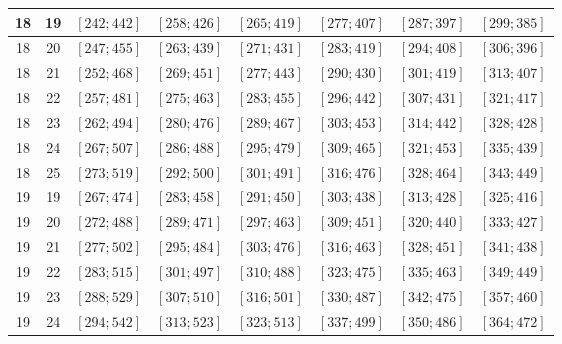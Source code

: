 \documentclass[a4paper,12pt]{article}
\begin{document}
\begin{center}
{\begin{longtable}[H]{|c|c|c|c|c|c|c|c|}
18 &  19 &  $\left[ 242; 442\right]$ &  $\left[ 258; 426\right]$ &  $\left[ 265; 419\right]$ &  $\left[ 277; 407\right]$ &  $\left[ 287; 397\right]$ &  $\left[ 299; 385\right]$ \tabularnewline \hline
18 &  20 &  $\left[ 247; 455\right]$ &  $\left[ 263; 439\right]$ &  $\left[ 271; 431\right]$ &  $\left[ 283; 419\right]$ &  $\left[ 294; 408\right]$ &  $\left[ 306; 396\right]$ \tabularnewline \hline
18 &  21 &  $\left[ 252; 468\right]$ &  $\left[ 269; 451\right]$ &  $\left[ 277; 443\right]$ &  $\left[ 290; 430\right]$ &  $\left[ 301; 419\right]$ &  $\left[ 313; 407\right]$ \tabularnewline \hline
18 &  22 &  $\left[ 257; 481\right]$ &  $\left[ 275; 463\right]$ &  $\left[ 283; 455\right]$ &  $\left[ 296; 442\right]$ &  $\left[ 307; 431\right]$ &  $\left[ 321; 417\right]$ \tabularnewline \hline
18 &  23 &  $\left[ 262; 494\right]$ &  $\left[ 280; 476\right]$ &  $\left[ 289; 467\right]$ &  $\left[ 303; 453\right]$ &  $\left[ 314; 442\right]$ &  $\left[ 328; 428\right]$ \tabularnewline \hline
18 &  24 &  $\left[ 267; 507\right]$ &  $\left[ 286; 488\right]$ &  $\left[ 295; 479\right]$ &  $\left[ 309; 465\right]$ &  $\left[ 321; 453\right]$ &  $\left[ 335; 439\right]$ \tabularnewline \hline
18 &  25 &  $\left[ 273; 519\right]$ &  $\left[ 292; 500\right]$ &  $\left[ 301; 491\right]$ &  $\left[ 316; 476\right]$ &  $\left[ 328; 464\right]$ &  $\left[ 343; 449\right]$ \tabularnewline \hline
19 &  19 &  $\left[ 267; 474\right]$ &  $\left[ 283; 458\right]$ &  $\left[ 291; 450\right]$ &  $\left[ 303; 438\right]$ &  $\left[ 313; 428\right]$ &  $\left[ 325; 416\right]$ \tabularnewline \hline
19 &  20 &  $\left[ 272; 488\right]$ &  $\left[ 289; 471\right]$ &  $\left[ 297; 463\right]$ &  $\left[ 309; 451\right]$ &  $\left[ 320; 440\right]$ &  $\left[ 333; 427\right]$ \tabularnewline \hline
19 &  21 &  $\left[ 277; 502\right]$ &  $\left[ 295; 484\right]$ &  $\left[ 303; 476\right]$ &  $\left[ 316; 463\right]$ &  $\left[ 328; 451\right]$ &  $\left[ 341; 438\right]$ \tabularnewline \hline
19 &  22 &  $\left[ 283; 515\right]$ &  $\left[ 301; 497\right]$ &  $\left[ 310; 488\right]$ &  $\left[ 323; 475\right]$ &  $\left[ 335; 463\right]$ &  $\left[ 349; 449\right]$ \tabularnewline \hline
19 &  23 &  $\left[ 288; 529\right]$ &  $\left[ 307; 510\right]$ &  $\left[ 316; 501\right]$ &  $\left[ 330; 487\right]$ &  $\left[ 342; 475\right]$ &  $\left[ 357; 460\right]$ \tabularnewline \hline
19 &  24 &  $\left[ 294; 542\right]$ &  $\left[ 313; 523\right]$ &  $\left[ 323; 513\right]$ &  $\left[ 337; 499\right]$ &  $\left[ 350; 486\right]$ &  $\left[ 364; 472\right]$ \tabularnewline \hline

\end{longtable}}
\end{center}
\end{document}

